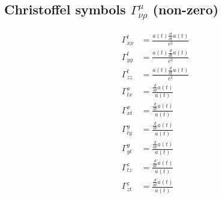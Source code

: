 \documentclass{article}
\begin{document}
\subsection{Christoffel symbols $\Gamma^{\mu}_{\nu\rho}$ (non-zero)}
\begin{align}
\Gamma^{t}_{x x} &= \frac{a{\left(t \right)} \frac{d}{d t} a{\left(t \right)}}{c^{2}} \\
\Gamma^{t}_{y y} &= \frac{a{\left(t \right)} \frac{d}{d t} a{\left(t \right)}}{c^{2}} \\
\Gamma^{t}_{z z} &= \frac{a{\left(t \right)} \frac{d}{d t} a{\left(t \right)}}{c^{2}} \\
\Gamma^{x}_{t x} &= \frac{\frac{d}{d t} a{\left(t \right)}}{a{\left(t \right)}} \\
\Gamma^{x}_{x t} &= \frac{\frac{d}{d t} a{\left(t \right)}}{a{\left(t \right)}} \\
\Gamma^{y}_{t y} &= \frac{\frac{d}{d t} a{\left(t \right)}}{a{\left(t \right)}} \\
\Gamma^{y}_{y t} &= \frac{\frac{d}{d t} a{\left(t \right)}}{a{\left(t \right)}} \\
\Gamma^{z}_{t z} &= \frac{\frac{d}{d t} a{\left(t \right)}}{a{\left(t \right)}} \\
\Gamma^{z}_{z t} &= \frac{\frac{d}{d t} a{\left(t \right)}}{a{\left(t \right)}} \\
\end{align}
\end{document}
